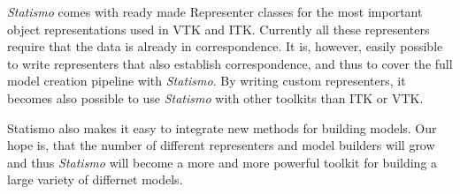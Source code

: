 \documentclass{InsightArticle}
\newcommand{\Statismo}{\emph{Statismo}\xspace}
\begin{document}
\Statismo comes with ready made Representer classes for the most important object representations used in VTK and ITK. 
Currently all these representers require that the data is already in correspondence. It is, however, easily possible to 
write representers that also establish correspondence, and thus to cover the full model creation pipeline with \Statismo.
By writing custom representers, it becomes also possible to use \Statismo with other toolkits than ITK or VTK. 

Statismo also makes it easy to integrate new methods for building models. Our hope is, that the number of different representers
and model builders will grow and thus \Statismo will become a more and more powerful toolkit for building a large variety of differnet 
models.







\end{document}
